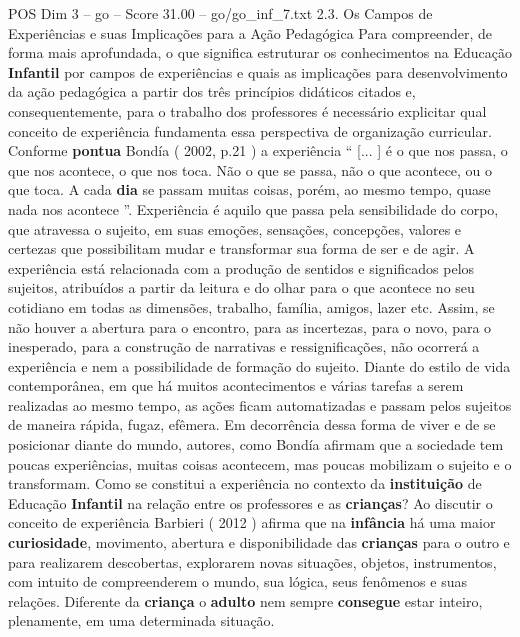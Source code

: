 \begin{textsample}{POS Dim 3 – go – Score 31.00 – go/go\_inf\_7.txt}  \label{ex:f3_pos_049}
2.3.
Os Campos de Experiências e suas Implicações para a Ação Pedagógica Para compreender, de forma mais aprofundada, o que significa estruturar os conhecimentos na Educação \textbf{Infantil} por campos de experiências e quais as implicações para desenvolvimento da ação pedagógica a partir dos três princípios didáticos citados e, consequentemente, para o trabalho dos professores é necessário explicitar qual conceito de experiência fundamenta essa perspectiva de organização curricular.
Conforme \textbf{pontua} Bondía ( 2002, p.21 ) a experiência “ [... ] é o que nos passa, o que nos acontece, o que nos toca.
Não o que se passa, não o que acontece, ou o que toca.
A cada \textbf{dia} se passam muitas coisas, porém, ao mesmo tempo, quase nada nos acontece ”.
Experiência é aquilo que passa pela sensibilidade do corpo, que atravessa o sujeito, em suas emoções, sensações, concepções, valores e certezas que possibilitam mudar e transformar sua forma de ser e de agir.
A experiência está relacionada com a produção de sentidos e significados pelos sujeitos, atribuídos a partir da leitura e do olhar para o que acontece no seu cotidiano em todas as dimensões, trabalho, família, amigos, lazer etc.
Assim, se não houver a abertura para o encontro, para as incertezas, para o novo, para o inesperado, para a construção de narrativas e ressignificações, não ocorrerá a experiência e nem a possibilidade de formação do sujeito.
Diante do estilo de vida contemporânea, em que há muitos acontecimentos e várias tarefas a serem realizadas ao mesmo tempo, as ações ficam automatizadas e passam pelos sujeitos de maneira rápida, fugaz, efêmera.
Em decorrência dessa forma de viver e de se posicionar diante do mundo, autores, como Bondía afirmam que a sociedade tem poucas experiências, muitas coisas acontecem, mas poucas mobilizam o sujeito e o transformam.
Como se constitui a experiência no contexto da \textbf{instituição} de Educação \textbf{Infantil} na relação entre os professores e as \textbf{crianças}?
Ao discutir o conceito de experiência Barbieri ( 2012 ) afirma que na \textbf{infância} há uma maior \textbf{curiosidade}, movimento, abertura e disponibilidade das \textbf{crianças} para o outro e para realizarem descobertas, explorarem novas situações, objetos, instrumentos, com intuito de compreenderem o mundo, sua lógica, seus fenômenos e suas relações.
Diferente da \textbf{criança} o \textbf{adulto} nem sempre \textbf{consegue} estar inteiro, plenamente, em uma determinada situação.

\end{textsample}
